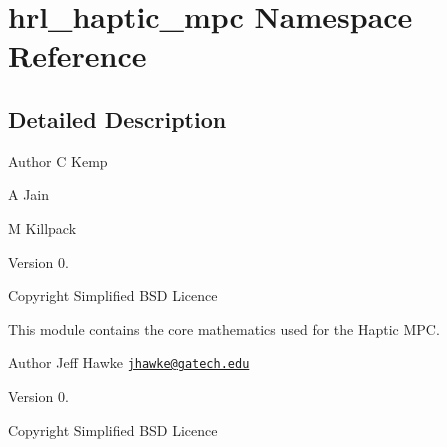 \hypertarget{namespacehrl__haptic__mpc}{\section{hrl\-\_\-haptic\-\_\-mpc \-Namespace \-Reference}
\label{namespacehrl__haptic__mpc}
}


\subsection{\-Detailed \-Description}
\begin{DoxyAuthor}{\-Author}
\-C \-Kemp 

\-A \-Jain 

\-M \-Killpack 
\end{DoxyAuthor}
\begin{DoxyVersion}{\-Version}
0. 
\end{DoxyVersion}
\begin{DoxyCopyright}{\-Copyright}
\-Simplified \-B\-S\-D \-Licence
\end{DoxyCopyright}
\-This module contains the core mathematics used for the \-Haptic \-M\-P\-C.

\begin{DoxyAuthor}{\-Author}
\-Jeff \-Hawke \href{mailto:jhawke@gatech.edu}{\tt jhawke@gatech.\-edu} 
\end{DoxyAuthor}
\begin{DoxyVersion}{\-Version}
0. 
\end{DoxyVersion}
\begin{DoxyCopyright}{\-Copyright}
\-Simplified \-B\-S\-D \-Licence 
\end{DoxyCopyright}
